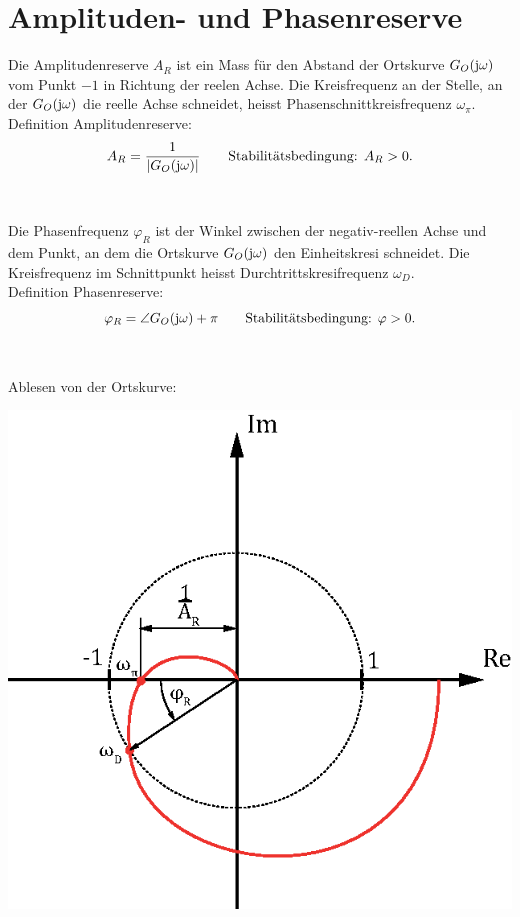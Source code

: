 \section{Amplituden- und Phasenreserve}
Die Amplitudenreserve $A_R$ ist ein Mass für den Abstand der Ortskurve $G_O(\im\omega)$ vom Punkt $-1$ in Richtung der reelen Achse. Die Kreisfrequenz an der Stelle, an der $G_O(\im\omega)$ die reelle Achse schneidet, heisst Phasenschnittkreisfrequenz $\omega_\pi$.\\
Definition Amplitudenreserve:
\[
	A_R = \frac{1}{\left|G_O(\im\omega)\right|} \qquad \text{Stabilitätsbedingung: } A_R > 0.
\]\\\\
Die Phasenfrequenz $\varphi_R$ ist der Winkel zwischen der negativ-reellen Achse und dem Punkt, an dem die Ortskurve  $G_O(\im\omega)$ den Einheitskresi schneidet. Die Kreisfrequenz im Schnittpunkt heisst Durchtrittskresifrequenz $\omega_D$.\\
Definition Phasenreserve:
\[
	\varphi_R = \angle{G_O(\im\omega)} + \pi \qquad \text{Stabilitätsbedingung: } \varphi > 0.
\]\\\\
Ablesen von der Ortskurve:
\begin{center}
	\includegraphics[scale=0.7]{images/ort_reserve.eps}
\end{center}
